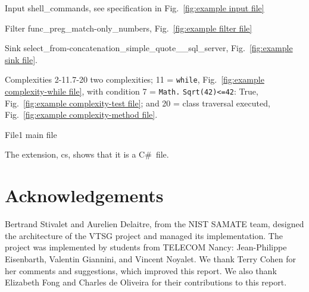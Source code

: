 \documentclass[12pt]{article}
\newcommand{\CSharp}{C{\fontseries{b}\selectfont\#}}
\begin{document}
\noindent Input	shell\_commands, see specification in Fig.~\ref{fig:example input file}

\noindent Filter  func\_preg\_match-only\_numbers, Fig.~\ref{fig:example filter file}

\noindent Sink	select\_from-concatenation\_simple\_quote\_\_sql\_server, 
Fig.~\ref{fig:example sink file}.

\noindent Complexities 2-11.7-20  two complexities; 11 = \verb|while|,
Fig.~\ref{fig:example complexity-while file}, 
with condition 7 = \verb|Math.| \verb|Sqrt(42)<=42|: True, Fig.~\ref{fig:example complexity-test file}; and
20 = class traversal executed, Fig.~\ref{fig:example complexity-method file}.

\noindent File1 main file

\noindent The extension, cs, shows that it is a \CSharp\ file.



\section{Acknowledgements}

Bertrand Stivalet and Aurelien Delaitre, from the NIST SAMATE team, designed the
architecture of the VTSG project and managed its implementation.  The project was
implemented by students from TELECOM Nancy: Jean-Philippe Eisenbarth, Valentin
Giannini, and Vincent Noyalet.  We thank Terry Cohen for her comments and
suggestions, which improved this report.  We also thank Elizabeth Fong and
Charles de Oliveira for their contributions to this report.
%
%
%
%
\end{document}
